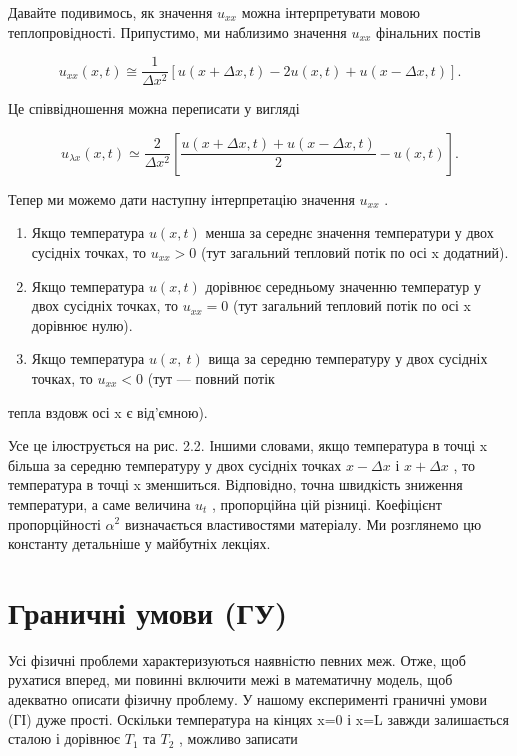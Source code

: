 \documentclass[
  ukrainian,
]{article}
\begin{document}
Давайте подивимось, як значення \(u_{xx}\) можна інтерпретувати мовою
теплопровідності. Припустимо, ми наблизимо значення \(u_{xx}\) фінальних
постів

\[
u_{xx}(x, t) \cong \frac{1}{\Delta x^2} [u(x + \Delta x, t) - 2u(x, t) + u(x - \Delta x, t)].
\]

Це співвідношення можна переписати у вигляді

\[
u_{\lambda x}(x, t) \simeq \frac{2}{\Delta x^2} \left[ \frac{u(x + \Delta x, t) + u(x - \Delta x, t)}{2} - u(x, t) \right].
\]

Тепер ми можемо дати наступну інтерпретацію значення \(u_{xx}\) .

\begin{enumerate}
\def\labelenumi{\arabic{enumi}.}
\item
  Якщо температура \(u(x, t)\) менша за середнє значення температури у
  двох сусідніх точках, то \(u_{xx} > 0\) (тут загальний тепловий потік
  по осі x додатний).
\item
  Якщо температура \(u(x, t)\) дорівнює середньому значенню температур у
  двох сусідніх точках, то \(u_{xx} = 0\) (тут загальний тепловий потік
  по осі x дорівнює нулю).
\item
  Якщо температура \(u\left(x,\ t\right)\) вища за середню температуру у
  двох сусідніх точках, то \(u_{xx}<0\) (тут --- повний потік
\end{enumerate}

тепла вздовж осі x є від'ємною).

Усе це ілюструється на рис. 2.2. Іншими словами, якщо температура в
точці x більша за середню температуру у двох сусідніх точках
\(x - \Delta x\) і \(x + \Delta x\) , то температура в точці x
зменшиться. Відповідно, точна швидкість зниження температури, а саме
величина \(u_t\) , пропорційна цій різниці. Коефіцієнт пропорційності
\(\alpha^2\) визначається властивостями матеріалу. Ми розглянемо цю
константу детальніше у майбутніх лекціях.

\section{Граничні умови
(ГУ)}\label{ux433ux440ux430ux43dux438ux447ux43dux456-ux443ux43cux43eux432ux438-ux433ux443}

Усі фізичні проблеми характеризуються наявністю певних меж. Отже, щоб
рухатися вперед, ми повинні включити межі в математичну модель, щоб
адекватно описати фізичну проблему. У нашому експерименті граничні умови
(ГІ) дуже прості. Оскільки температура на кінцях x=0 і x=L завжди
залишається сталою і дорівнює \(T_1\) та \(T_2\) , можливо записати
\end{document}
